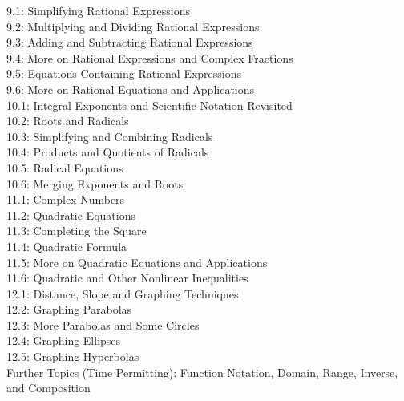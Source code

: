 \documentclass[11pt]{article}
\begin{document}
{9.1: Simplifying Rational Expressions \\
9.2: Multiplying and Dividing Rational Expressions \\
9.3: Adding and Subtracting Rational Expressions \\
9.4: More on Rational Expressions and Complex Fractions \\
9.5: Equations Containing Rational Expressions \\
9.6: More on Rational Equations and Applications \\
10.1: Integral Exponents and Scientific Notation Revisited \\
10.2: Roots and Radicals \\
10.3: Simplifying and Combining Radicals \\
10.4: Products and Quotients of Radicals \\
10.5: Radical Equations \\
10.6: Merging Exponents and Roots \\
11.1: Complex Numbers \\
11.2: Quadratic Equations \\
11.3: Completing the Square \\
11.4: Quadratic Formula \\
11.5: More on Quadratic Equations and Applications \\
11.6: Quadratic and Other Nonlinear Inequalities \\
12.1: Distance, Slope and Graphing Techniques \\
12.2: Graphing Parabolas \\
12.3: More Parabolas and Some Circles \\
12.4: Graphing Ellipses \\
12.5: Graphing Hyperbolas \\
Further Topics (Time Permitting): Function Notation, Domain, Range, Inverse, and Composition
}
\end{document}
